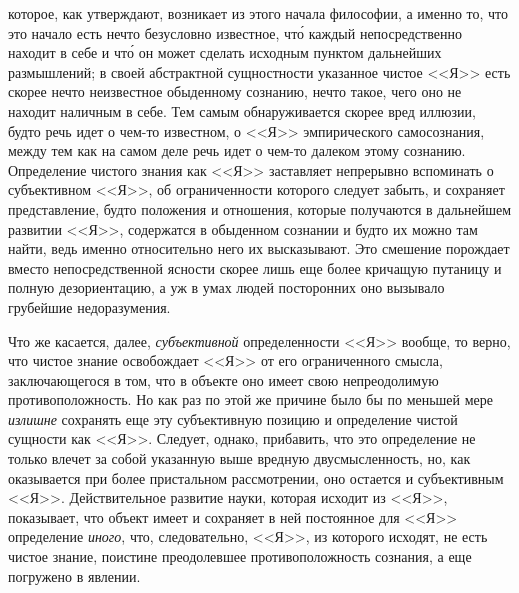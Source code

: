 которое, как утверждают, возникает из этого начала философии,
а именно то, что это начало есть нечто безусловно
известное, чт\'о каждый непосредственно находит
в себе и чт\'о он может сделать исходным пунктом дальнейших
размышлений; в своей абстрактной сущностности
указанное чистое <<Я>> есть скорее нечто неизвестное
обыденному сознанию, нечто такое, чего оно не находит
наличным в себе. Тем самым обнаруживается скорее
вред иллюзии, будто речь идет о чем-то известном, о <<Я>>
эмпирического самосознания, между тем как на самом
деле речь идет о чем-то далеком этому сознанию. Определение
чистого знания как <<Я>> заставляет непрерывно
вспоминать о субъективном <<Я>>, об ограниченности которого
следует забыть, и сохраняет представление, будто
положения и отношения, которые получаются в дальнейшем
развитии <<Я>>, содержатся в обыденном сознании
и будто их можно там найти, ведь именно относительно
него их высказывают. Это смешение порождает
вместо непосредственной ясности скорее лишь еще более
кричащую путаницу и полную дезориентацию, а уж
в умах людей посторонних оно вызывало грубейшие недоразумения.


Что же касается, далее, \emph{субъективной} определенности
<<Я>> вообще, то верно, что чистое знание освобождает
<<Я>> от его ограниченного смысла, заключающегося в том,
что в объекте оно имеет свою непреодолимую противоположность.
Но как раз по этой же причине было бы по
меньшей мере \emph{излишне} сохранять еще эту субъективную
позицию и определение чистой сущности как <<Я>>. Следует,
однако, прибавить, что это определение не только
влечет за собой указанную выше вредную двусмысленность,
но, как оказывается при более пристальном рассмотрении,
оно остается и субъективным <<Я>>. Действительное
развитие науки, которая исходит из <<Я>>, показывает,
что объект имеет и сохраняет в ней постоянное
для <<Я>> определение \emph{иного}, что, следовательно, <<Я>>, из
которого исходят, не есть чистое знание, поистине преодолевшее
противоположность сознания, а еще погружено
в явлении.

